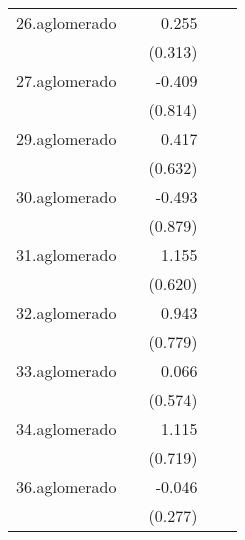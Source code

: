 {\begin{longtable}{l*{4}{D{.}{.}{-1}}}
\addlinespace
26.aglomerado&                     &       0.255         &                     &                     \\
            &                     &     (0.313)         &                     &                     \\
\addlinespace
27.aglomerado&                     &      -0.409         &                     &                     \\
            &                     &     (0.814)         &                     &                     \\
\addlinespace
29.aglomerado&                     &       0.417         &                     &                     \\
            &                     &     (0.632)         &                     &                     \\
\addlinespace
30.aglomerado&                     &      -0.493         &                     &                     \\
            &                     &     (0.879)         &                     &                     \\
\addlinespace
31.aglomerado&                     &       1.155         &                     &                     \\
            &                     &     (0.620)         &                     &                     \\
\addlinespace
32.aglomerado&                     &       0.943         &                     &                     \\
            &                     &     (0.779)         &                     &                     \\
\addlinespace
33.aglomerado&                     &       0.066         &                     &                     \\
            &                     &     (0.574)         &                     &                     \\
\addlinespace
34.aglomerado&                     &       1.115         &                     &                     \\
            &                     &     (0.719)         &                     &                     \\
\addlinespace
36.aglomerado&                     &      -0.046         &                     &                     \\
            &                     &     (0.277)         &                     &                     \\

\end{longtable}}
